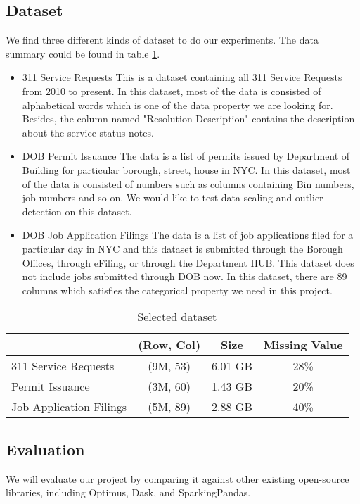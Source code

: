 \documentclass[sigconf]{acmart}
\begin{document}
\subsection{Dataset}
We find three different kinds of dataset to do our experiments. The data summary could be found in table \ref{tab:dataset}.
\begin{itemize}
	\item{311 Service Requests}\cite{nycopendata1} This is a dataset containing all 311 Service Requests from 2010 to present. In this dataset, most of the data is consisted of alphabetical words which is one of the data property we are looking for. Besides, the column named "Resolution Description" contains the description about the service status notes.
	\item{DOB Permit Issuance}\cite{nycopendata2} The data is a list of permits issued by Department of Building for particular borough, street, house in NYC. In this dataset, most of the data is consisted of numbers such as columns containing Bin numbers, job numbers and so on. We would like to test data scaling and outlier detection on this dataset.
	\item{DOB Job Application Filings}\cite{nycopendata3} The data is a list of job applications filed for a particular day in NYC and this dataset is submitted through the Borough Offices, through eFiling, or through the Department HUB. This dataset does not include jobs submitted through DOB now. In this dataset, there are 89 columns which satisfies the categorical property we need in this project.
\end{itemize}

\begin{table}
\caption{Selected dataset}   
\label{tab:dataset}
\begin{tabular}{lccc}   
 		                 & (Row, Col)  & Size      & Missing Value  \\  
\hline
 311 Service Requests   & (9M, 53)     & 6.01 GB  & 28\%            \\ 
 Permit Issuance            & (3M, 60)     & 1.43 GB  & 20\%             \\  
 Job Application Filings   & (5M, 89)     & 2.88 GB  & 40\%             \\ 


\end{tabular}   
\end{table}

\subsection{Evaluation}
We will evaluate our project by comparing it against other existing open-source libraries, including Optimus\cite{optimus}, Dask\cite{dask}, and SparkingPandas\cite{sparklingpandas}. 
\end{document}
